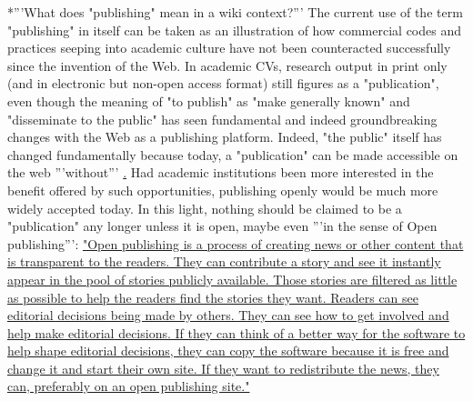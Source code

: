 \documentclass[final,authoryear,3p]{elsarticle-open-drafting}
\begin{document}
\begin{enumerate}
*'''What does "publishing" mean in a wiki context?''' The current use of the term "publishing" in itself can be taken as an illustration of how commercial codes and practices seeping into academic culture have not been counteracted successfully since the invention of the Web. In academic CVs, research output in print only (and in electronic but non-open access format) still figures as a "publication", even though the meaning of "to publish" as "make generally known" and "disseminate to the public" has seen fundamental and indeed groundbreaking changes with the Web as a publishing platform. Indeed, "the public" itself has changed fundamentally because today, a "publication" can be made accessible on the web '''without''' \href{http://scientopia.org/blogs/bookoftrogool/2010/03/15/battle-of-the-opens/ "a subscription, per-article, or other fee ... by the reader or the reader's proxy (e.g. a library)"}. Had academic institutions been more interested in the benefit offered by such opportunities, publishing openly would be much more widely accepted today. In this light, nothing should be claimed to be a "publication" any longer unless it is open, maybe even '''in the sense of Open publishing''': \href{http://en.wikipedia.org/w/index.php?title=Special:Cite&page=Open_publishing&id=383242580}{"Open publishing is a process of creating news or other content that is transparent to the readers. They can contribute a story and see it instantly appear in the pool of stories publicly available. Those stories are filtered as little as possible to help the readers find the stories they want. Readers can see editorial decisions being made by others. They can see how to get involved and help make editorial decisions. If they can think of a better way for the software to help shape editorial decisions, they can copy the software because it is free and change it and start their own site. If they want to redistribute the news, they can, preferably on an open publishing site."}


\end{enumerate}
\end{document}
